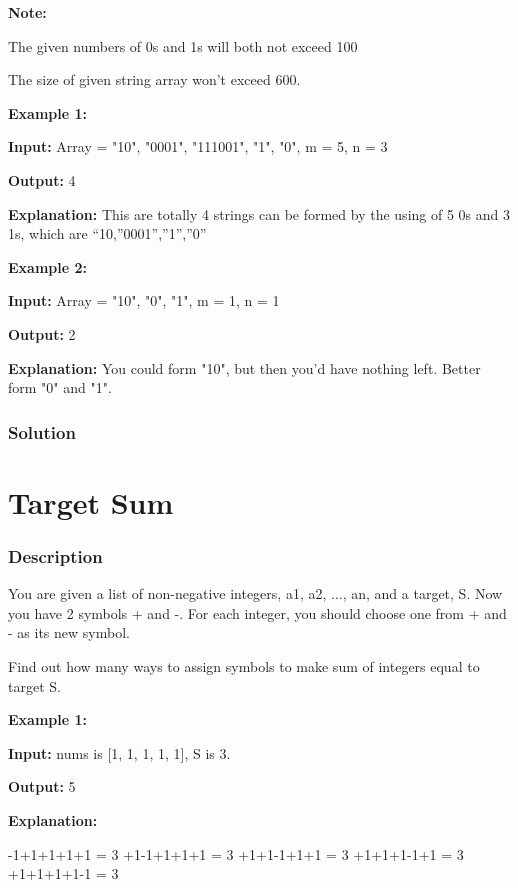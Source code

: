 \textbf{Note:}

The given numbers of 0s and 1s will both not exceed 100

The size of given string array won't exceed 600.

\textbf{Example 1:}

\textbf{Input:} Array = {"10", "0001", "111001", "1", "0"}, m = 5, n = 3

\textbf{Output:} 4

\textbf{Explanation:} This are totally 4 strings can be formed by the using of 5 0s and 3 1s, which are “10,”0001”,”1”,”0”

\textbf{Example 2:}

\textbf{Input:} Array = {"10", "0", "1"}, m = 1, n = 1

\textbf{Output:} 2

\textbf{Explanation:} You could form "10", but then you'd have nothing left. Better form "0" and "1".
\subsubsection{Solution}

\begin{Code}

\end{Code}

\newpage

\section{Target Sum} %

\subsubsection{Description}
You are given a list of non-negative integers, a1, a2, ..., an, and a target, S. Now you have 2 symbols + and -. For each integer, you should choose one from + and - as its new symbol.

Find out how many ways to assign symbols to make sum of integers equal to target S.

\textbf{Example 1:}

\textbf{Input:} nums is [1, 1, 1, 1, 1], S is 3.

\textbf{Output:} 5

\textbf{Explanation:}

\begin{Code}
-1+1+1+1+1 = 3
+1-1+1+1+1 = 3
+1+1-1+1+1 = 3
+1+1+1-1+1 = 3
+1+1+1+1-1 = 3
\end{Code}

